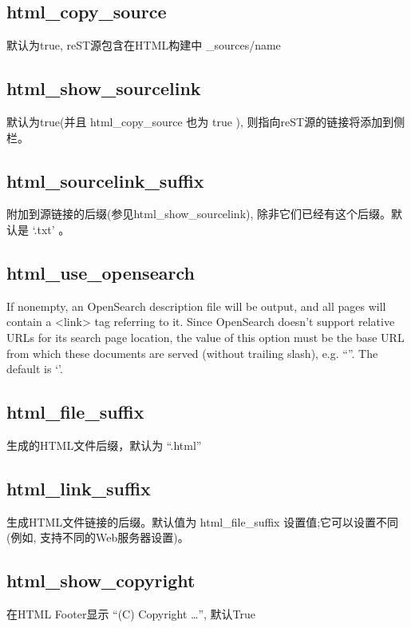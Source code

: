 \documentclass[a4paper,10pt,english]{sphinxmanual}
\begin{document}
\subsection{html\_copy\_source}
\label{\detokenize{sphinx_conf:html-copy-source}}
\sphinxAtStartPar
默认为true, reST源包含在HTML构建中 \_sources/name


\subsection{html\_show\_sourcelink}
\label{\detokenize{sphinx_conf:html-show-sourcelink}}
\sphinxAtStartPar
默认为true(并且 html\_copy\_source 也为 true ), 则指向reST源的链接将添加到侧栏。


\subsection{html\_sourcelink\_suffix}
\label{\detokenize{sphinx_conf:html-sourcelink-suffix}}
\sphinxAtStartPar
附加到源链接的后缀(参见html\_show\_sourcelink), 除非它们已经有这个后缀。默认是 ‘.txt’ 。


\subsection{html\_use\_opensearch}
\label{\detokenize{sphinx_conf:html-use-opensearch}}
\sphinxAtStartPar
If nonempty, an OpenSearch description file will be output, and all pages will contain a <link> tag referring to it.
Since OpenSearch doesn’t support relative URLs for its search page location,
the value of this option must be the base URL from which these documents are served (without trailing slash), e.g. “”. The default is ‘’.


\subsection{html\_file\_suffix}
\label{\detokenize{sphinx_conf:html-file-suffix}}
\sphinxAtStartPar
生成的HTML文件后缀，默认为 “.html”


\subsection{html\_link\_suffix}
\label{\detokenize{sphinx_conf:html-link-suffix}}
\sphinxAtStartPar
生成HTML文件链接的后缀。默认值为 html\_file\_suffix 设置值;它可以设置不同(例如, 支持不同的Web服务器设置)。


\subsection{html\_show\_copyright}
\label{\detokenize{sphinx_conf:html-show-copyright}}
\sphinxAtStartPar
在HTML Footer显示 “(C) Copyright …”, 默认True
\end{document}
